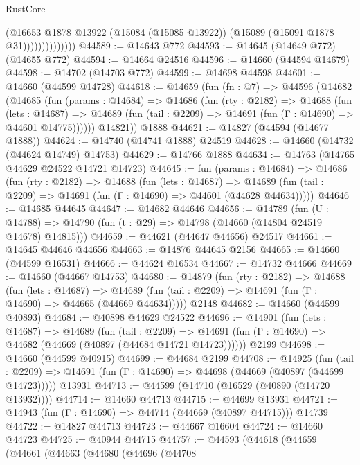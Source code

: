 \begin{lexlean}{RustCore}
\begin{coremodule}
                          (@16653
                            @1878
                            @13922
                            (@15084 (@15085 @13922))
                            (@15089 (@15091 @1878 @31))))))))))))))
@44589 := @14643 @772
@44593 := @14645 (@14649 @772) (@14655 @772)
@44594 := @14664 @24516
@44596 := @14660 (@44594 @14679)
@44598 := @14702 (@14703 @772)
@44599 := @14698 @44598
@44601 := @14660 (@44599 @14728)
@44618 := @14659
    (fun (fn : @7) =>
    @44596
      (@14682
        (@14685
          (fun (params : @14684) =>
          @14686
            (fun (rty : @2182) =>
            @14688
              (fun (lets : @14687) =>
              @14689 (fun (tail : @2209) => @14691 (fun (Γ : @14690) => @44601 @14775))))))
        @14821))
    @1888
@44621 := @14827 (@44594 (@14677 @1888))
@44624 := @14740 (@14741 @1888) @24519
@44628 := @14660 (@14732 (@44624 @14749) @14753)
@44629 := @14766 @1888
@44634 := @14763 (@14765 @44629 @24522 @14721 @14723)
@44645 := fun (params : @14684) =>
  @14686
    (fun (rty : @2182) =>
    @14688
      (fun (lets : @14687) =>
      @14689 (fun (tail : @2209) => @14691 (fun (Γ : @14690) => @44601 (@44628 @44634)))))
@44646 := @14685 @44645
@44647 := @14682 @44646
@44656 := @14789
    (fun (U : @14788) => @14790 (fun (t : @29) => @14798 (@14660 (@14804 @24519 @14678) @14815)))
@44659 := @44621 (@44647 @44656) @24517
@44661 := @14645 @44646 @44656
@44663 := @14876 @44645 @2156
@44665 := @14660 (@44599 @16531)
@44666 := @44624 @16534
@44667 := @14732 @44666
@44669 := @14660 (@44667 @14753)
@44680 := @14879
    (fun (rty : @2182) =>
    @14688
      (fun (lets : @14687) =>
      @14689 (fun (tail : @2209) => @14691 (fun (Γ : @14690) => @44665 (@44669 @44634)))))
    @2148
@44682 := @14660 (@44599 @40893)
@44684 := @40898 @44629 @24522
@44696 := @14901
    (fun (lets : @14687) =>
    @14689
      (fun (tail : @2209) =>
      @14691 (fun (Γ : @14690) => @44682 (@44669 (@40897 (@44684 @14721 @14723))))))
    @2199
@44698 := @14660 (@44599 @40915)
@44699 := @44684 @2199
@44708 := @14925
    (fun (tail : @2209) => @14691 (fun (Γ : @14690) => @44698 (@44669 (@40897 (@44699 @14723)))))
    @13931
@44713 := @44599 (@14710 (@16529 (@40890 (@14720 @13932))))
@44714 := @14660 @44713
@44715 := @44699 @13931
@44721 := @14943 (fun (Γ : @14690) => @44714 (@44669 (@40897 @44715))) @14739
@44722 := @14827 @44713
@44723 := @44667 @16604
@44724 := @14660 @44723
@44725 := @40944 @44715
@44757 := @44593
    (@44618
      (@44659
        (@44661
          (@44663
            (@44680
              (@44696
                (@44708

\end{coremodule}
\end{lexlean}
